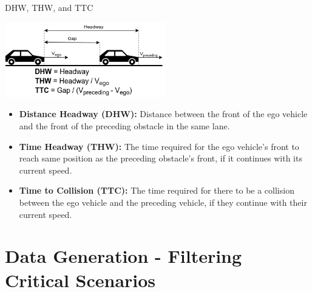\documentclass[shortpres]{beamer}
\begin{document}
\begin{frame}{DHW, THW, and TTC}	

\begin{center}
    \includegraphics[width=7cm]{dhw_thw_ttc}
\end{center}

\begin{itemize} 
\fontsize{9pt}{10pt}\selectfont \item \textbf{Distance Headway (DHW):} Distance between the front of the ego vehicle and the front of the preceding obstacle in the same lane.
\fontsize{9pt}{10pt}\selectfont \item \textbf{Time Headway (THW):} The time required for the ego vehicle's front to reach same position as the preceding obstacle's front, if it continues with its current speed.
\fontsize{9pt}{10pt}\selectfont \item \textbf{Time to Collision (TTC):} The time required for there to be a collision between the ego vehicle and the preceding vehicle, if they continue with their current speed.
\end{itemize}

\end{frame}

\section{Data Generation - Filtering Critical Scenarios}	
\end{document}
